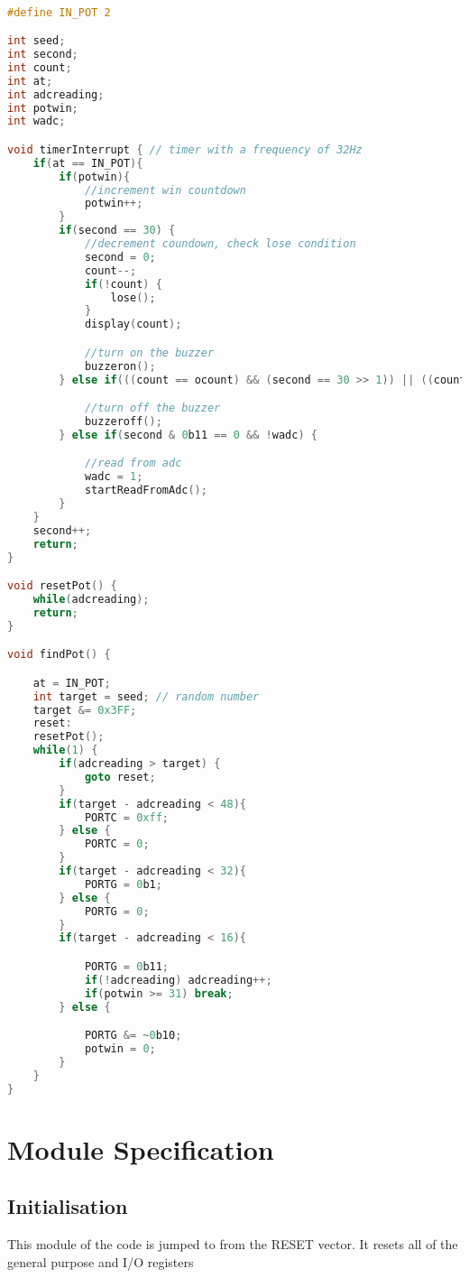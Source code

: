 \documentclass[a4paper]{article}
\begin{document}
\begin{lstlisting}[language=C, caption={Algorithm for \texttt{findPot()}}]

#define IN_POT 2

int seed;
int second;
int count;
int at;
int adcreading;
int potwin;
int wadc;

void timerInterrupt { // timer with a frequency of 32Hz
	if(at == IN_POT){
		if(potwin){
			//increment win countdown
			potwin++;
		}
		if(second == 30) {
			//decrement coundown, check lose condition
			second = 0;
			count--;
			if(!count) {
				lose();
			}
			display(count);

			//turn on the buzzer
			buzzeron();
		} else if(((count == ocount) && (second == 30 >> 1)) || ((count != ocount) && (second == 30 >> 2))) {

			//turn off the buzzer
			buzzeroff();				
		} else if(second & 0b11 == 0 && !wadc) {

			//read from adc
			wadc = 1;
			startReadFromAdc();
		}
	}
	second++;
	return;
}

void resetPot() {
	while(adcreading);
	return;
}

void findPot() {

	at = IN_POT;
	int target = seed; // random number
	target &= 0x3FF;
	reset:
	resetPot();
	while(1) {
		if(adcreading > target) {
			goto reset;
		}
		if(target - adcreading < 48){
			PORTC = 0xff;
		} else {
			PORTC = 0;
		}
		if(target - adcreading < 32){
			PORTG = 0b1;
		} else {
			PORTG = 0;
		}
		if(target - adcreading < 16){

			PORTG = 0b11;
			if(!adcreading) adcreading++;
			if(potwin >= 31) break;
		} else {

			PORTG &= ~0b10;
			potwin = 0;
		}
	}
}

\end{lstlisting}

\section{Module Specification}

\subsection{Initialisation}
This module of the code is jumped to from the RESET vector. It resets all of the general purpose and I/O registers 
\end{document}
